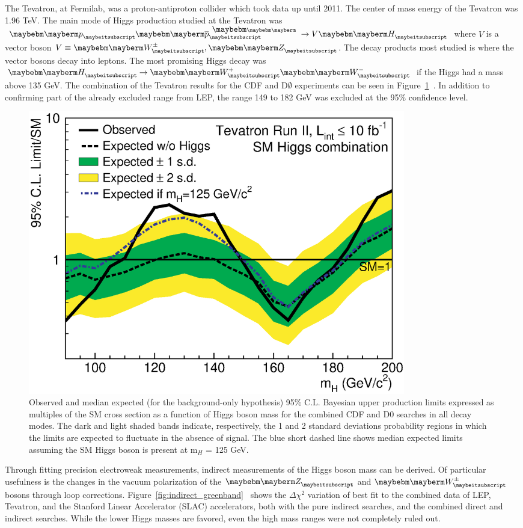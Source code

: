 The Tevatron, at Fermilab, was a proton-antiproton collider which took data up until 2011.  The center of mass energy of the Tevatron was 1.96 TeV.  The main mode of Higgs production studied at the Tevatron was $\Pp\Pap \rightarrow V\PH$ where $V$ is a vector boson $V\equiv \PWpm,\PZ$.  The decay products most studied is where the vector bosons decay into leptons.  The most promising Higgs decay was $\PH \rightarrow \PWp\PWm$ if the Higgs had a mass above 135 GeV.  The combination of the Tevatron results for the CDF and D$\emptyset$ experiments can be seen in Figure~\ref{fig:comboRatio}~\cite{CDFandD0:2011aa}. In addition to confirming part of the already excluded range from LEP, the range 149 to 182 GeV was excluded at the 95\% confidence level.

\begin{figure}[htb]
\centering
\includegraphics[width=0.8\textwidth]{StandardModel/tevsmlimits_feb2013.eps}
\caption{\small
Observed and median expected (for the background-only hypothesis) 95\% C.L. Bayesian upper production limits expressed as multiples of the SM cross section as a function of Higgs boson mass for the combined CDF and D0 searches in all decay modes. The dark and light shaded bands indicate, respectively, the 1 and 2 standard deviations probability regions in which the limits are expected to fluctuate in the absence of signal. The blue short dashed line shows median expected limits assuming the SM Higgs boson is present at m$_H$ = 125 GeV.~\cite{CDFandD0:2011aa}
}
\label{fig:comboRatio}
\end{figure}


Through fitting precision electroweak measurements, indirect measurements of the Higgs boson mass can be derived. Of particular usefulness is the changes in the vacuum polarization of the $\PZ$ and $\PWpm$ bosons through loop corrections. Figure~\ref{fig:indirect_greenband}~\cite{Flacher:2008zq} shows the $\Delta\chi^2$ variation of best fit to the combined data of LEP, Tevatron, and the Stanford Linear Accelerator (SLAC) accelerators, both with the pure indirect searches, and the combined direct and indirect searches.  While the lower Higgs masses are favored, even the high mass ranges were not completely ruled out.

